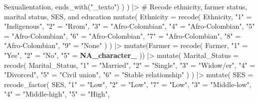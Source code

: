 \documentclass[
  bookmarksnumbered]{article}
\newenvironment{Shaded}{\begin{snugshade}}{\end{snugshade}}
\newcommand{\AttributeTok}[1]{\textcolor[rgb]{0.80,0.80,0.80}{#1}}
\newcommand{\CommentTok}[1]{\textcolor[rgb]{0.50,0.62,0.50}{#1}}
\newcommand{\ConstantTok}[1]{\textcolor[rgb]{0.86,0.64,0.64}{\textbf{#1}}}
\newcommand{\FunctionTok}[1]{\textcolor[rgb]{0.94,0.94,0.56}{#1}}
\newcommand{\NormalTok}[1]{\textcolor[rgb]{0.80,0.80,0.80}{#1}}
\newcommand{\OtherTok}[1]{\textcolor[rgb]{0.94,0.94,0.56}{#1}}
\newcommand{\SpecialCharTok}[1]{\textcolor[rgb]{0.86,0.64,0.64}{#1}}
\newcommand{\StringTok}[1]{\textcolor[rgb]{0.80,0.58,0.58}{#1}}
\begin{document}
\begin{Shaded}
\begin{Highlighting}[]
\NormalTok{      Sexualientation,}
      \FunctionTok{ends\_with}\NormalTok{(}\StringTok{"\_texto"}\NormalTok{)}
\NormalTok{    )}
\NormalTok{  ) }\SpecialCharTok{|\textgreater{}}
  \CommentTok{\# Recode ethnicity, farmer status, marital status, SES, and education}
  \FunctionTok{mutate}\NormalTok{(}
    \AttributeTok{Ethnicity =} \FunctionTok{recode}\NormalTok{(}
\NormalTok{      Ethnicity,}
      \StringTok{"1"} \OtherTok{=} \StringTok{"Indigenous"}\NormalTok{,}
      \StringTok{"2"} \OtherTok{=} \StringTok{"Rrom"}\NormalTok{,}
      \StringTok{"3"} \OtherTok{=} \StringTok{"Afro{-}Colombian"}\NormalTok{,}
      \StringTok{"4"} \OtherTok{=} \StringTok{"Afro{-}Colombian"}\NormalTok{,}
      \StringTok{"5"} \OtherTok{=} \StringTok{"Afro{-}Colombian"}\NormalTok{,}
      \StringTok{"6"} \OtherTok{=} \StringTok{"Afro{-}Colombian"}\NormalTok{,}
      \StringTok{"7"} \OtherTok{=} \StringTok{"Afro{-}Colombian"}\NormalTok{,}
      \StringTok{"8"} \OtherTok{=} \StringTok{"Afro{-}Colombian"}\NormalTok{,}
      \StringTok{"9"} \OtherTok{=} \StringTok{"None"}
\NormalTok{    )}
\NormalTok{  ) }\SpecialCharTok{|\textgreater{}}
  \FunctionTok{mutate}\NormalTok{(}\AttributeTok{Farmer =} \FunctionTok{recode}\NormalTok{(}
\NormalTok{    Farmer,}
    \StringTok{"1"} \OtherTok{=} \StringTok{"Yes"}\NormalTok{,}
    \StringTok{"2"} \OtherTok{=} \StringTok{"No"}\NormalTok{,}
    \StringTok{"5"} \OtherTok{=} \ConstantTok{NA\_character\_}
\NormalTok{  )) }\SpecialCharTok{|\textgreater{}}
  \FunctionTok{mutate}\NormalTok{(}
    \AttributeTok{Marital\_Status =} \FunctionTok{recode}\NormalTok{(}
\NormalTok{      Marital\_Status,}
      \StringTok{"1"} \OtherTok{=} \StringTok{"Married"}\NormalTok{,}
      \StringTok{"2"} \OtherTok{=} \StringTok{"Single"}\NormalTok{,}
      \StringTok{"3"} \OtherTok{=} \StringTok{"Widow/er"}\NormalTok{,}
      \StringTok{"4"} \OtherTok{=} \StringTok{"Divorced"}\NormalTok{,}
      \StringTok{"5"} \OtherTok{=} \StringTok{"Civil union"}\NormalTok{,}
      \StringTok{"6"} \OtherTok{=} \StringTok{"Stable relationship"}
\NormalTok{    )}
\NormalTok{  ) }\SpecialCharTok{|\textgreater{}}
  \FunctionTok{mutate}\NormalTok{(}
    \AttributeTok{SES =} \FunctionTok{recode\_factor}\NormalTok{(}
\NormalTok{      SES,}
      \StringTok{"1"} \OtherTok{=} \StringTok{"Low"}\NormalTok{,}
      \StringTok{"2"} \OtherTok{=} \StringTok{"Low"}\NormalTok{,}
      \StringTok{"7"} \OtherTok{=} \StringTok{"Low"}\NormalTok{,}
      \StringTok{"3"} \OtherTok{=} \StringTok{"Middle{-}low"}\NormalTok{,}
      \StringTok{"4"} \OtherTok{=} \StringTok{"Middle{-}high"}\NormalTok{,}
      \StringTok{"5"} \OtherTok{=} \StringTok{"High"}\NormalTok{,}

\end{Highlighting}
\end{Shaded}
\end{document}
